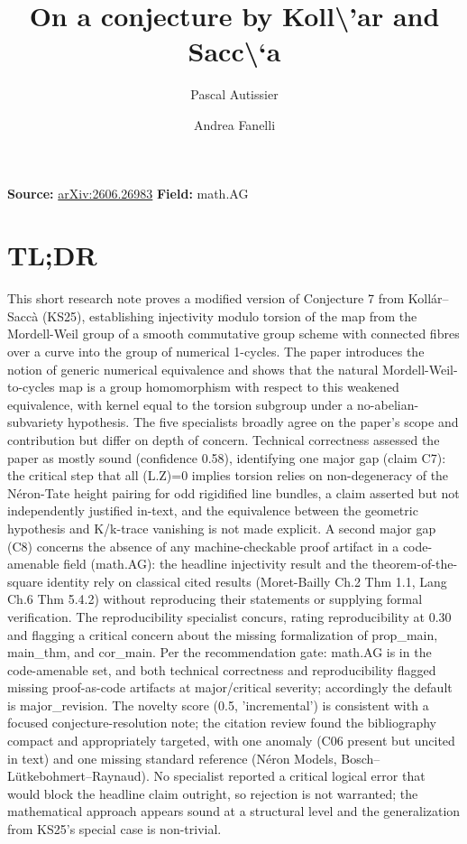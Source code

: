 \documentclass[11pt]{article}
\title{On a conjecture by Koll\textbackslash{}'ar and Sacc\textbackslash{}`a}
\author{Pascal Autissier \and Andrea Fanelli}
\date{}
\begin{document}
\maketitle

\noindent\textbf{Source:} \href{https://arxiv.org/abs/2606.26983}{arXiv:2606.26983} \quad \textbf{Field:} math.AG\\

\section*{TL;DR}
This short research note proves a modified version of Conjecture 7 from Kollár--Saccà (KS25), establishing injectivity modulo torsion of the map from the Mordell-Weil group of a smooth commutative group scheme with connected fibres over a curve into the group of numerical 1-cycles. The paper introduces the notion of generic numerical equivalence and shows that the natural Mordell-Weil-to-cycles map is a group homomorphism with respect to this weakened equivalence, with kernel equal to the torsion subgroup under a no-abelian-subvariety hypothesis. The five specialists broadly agree on the paper's scope and contribution but differ on depth of concern. Technical correctness assessed the paper as mostly sound (confidence 0.58), identifying one major gap (claim C7): the critical step that all (L.Z)=0 implies torsion relies on non-degeneracy of the Néron-Tate height pairing for odd rigidified line bundles, a claim asserted but not independently justified in-text, and the equivalence between the geometric hypothesis and K/k-trace vanishing is not made explicit. A second major gap (C8) concerns the absence of any machine-checkable proof artifact in a code-amenable field (math.AG): the headline injectivity result and the theorem-of-the-square identity rely on classical cited results (Moret-Bailly Ch.2 Thm 1.1, Lang Ch.6 Thm 5.4.2) without reproducing their statements or supplying formal verification. The reproducibility specialist concurs, rating reproducibility at 0.30 and flagging a critical concern about the missing formalization of prop\_main, main\_thm, and cor\_main. Per the recommendation gate: math.AG is in the code-amenable set, and both technical correctness and reproducibility flagged missing proof-as-code artifacts at major/critical severity; accordingly the default is major\_revision. The novelty score (0.5, 'incremental') is consistent with a focused conjecture-resolution note; the citation review found the bibliography compact and appropriately targeted, with one anomaly (C06 present but uncited in text) and one missing standard reference (Néron Models, Bosch--Lütkebohmert--Raynaud). No specialist reported a critical logical error that would block the headline claim outright, so rejection is not warranted; the mathematical approach appears sound at a structural level and the generalization from KS25's special case is non-trivial.
\end{document}

